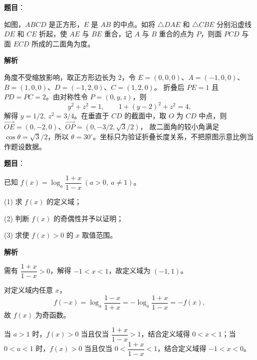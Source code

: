 \begin{answer}

\textbf{题目}：

如图，$ABCD$ 是正方形，$E$ 是 $AB$ 的中点。如将 $\triangle DAE$ 和 $\triangle CBE$ 分别沿虚线 $DE$ 和 $CE$ 折起，使 $AE$ 与 $BE$ 重合，记 $A$ 与 $B$ 重合的点为 $P$，则面 $PCD$ 与面 $ECD$ 所成的二面角为\underline{\qquad\qquad}度。
\nopagebreak[4]
\begin{center}\end{center}
\nopagebreak[4]
\textbf{解析}

角度不受缩放影响，取正方形边长为 $2$，令
$E=(0,0,0)$、$A=(-1,0,0)$、$B=(1,0,0)$、$D=(-1,2,0)$、$C=(1,2,0)$。
折叠后 $PE=1$ 且 $PD=PC=2$。由对称性令 $P=(0,y,z)$，则
\nopagebreak[4]
\[
y^2+z^2=1,\qquad 1+(y-2)^2+z^2=4,
\]
解得 $y=1/2,\ z^2=3/4$。在垂直于 $CD$ 的截面中，取 $O$ 为 $CD$ 中点，则
$\overrightarrow{OE}=(0,-2,0)$、$\overrightarrow{OP}=(0,-3/2,\sqrt3/2)$，
故二面角的较小角满足 $\cos\theta=\sqrt3/2$，所以 $\theta=30^\circ$。坐标只为验证折叠长度关系，不把原图示意比例当作题设数据。


\end{answer}
\begin{answer}

\textbf{题目}：

已知 $f(x)=\log_a\dfrac{1+x}{1-x}\ (a>0,\ a\ne1)$。

(1) 求 $f(x)$ 的定义域；

(2) 判断 $f(x)$ 的奇偶性并予以证明；

(3) 求使 $f(x)>0$ 的 $x$ 取值范围。

\textbf{解析}


需有 \(\dfrac{1+x}{1-x}>0\)，解得 \(-1<x<1\)，故定义域为 \((-1,1)\)。


对定义域内任意 \(x\)，
\nopagebreak[4]
\[
f(-x)=\log_a\frac{1-x}{1+x}=-\log_a\frac{1+x}{1-x}=-f(x),
\]
故 \(f(x)\) 为奇函数。


当 \(a>1\) 时，\(f(x)>0\) 当且仅当 \(\dfrac{1+x}{1-x}>1\)，结合定义域得 \(0<x<1\)；当 \(0<a<1\) 时，\(f(x)>0\) 当且仅当 \(0<\dfrac{1+x}{1-x}<1\)，结合定义域得 \(-1<x<0\)。




\end{answer}
